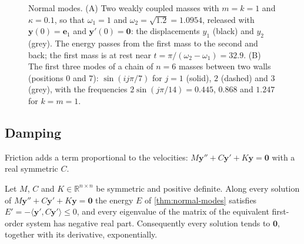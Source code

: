 \begin{figure}
\hfill
{}
\caption{Normal modes. (A) Two weakly coupled masses with $m=k=1$ and $\kappa=0.1$, so that $\omega_1=1$ and $\omega_2=\sqrt{1.2}=1.0954$, released with $\mathbf y(0)=\mathbf e_1$ and $\mathbf y'(0)=\mathbf 0$: the displacements $y_1$ (black) and $y_2$ (grey). The energy passes from the first mass to the second and back; the first mass is at rest near $t=\pi/(\omega_2-\omega_1)=32.9$. (B) The first three modes of a chain of $n=6$ masses between two walls (positions $0$ and $7$): $\sin(ij\pi/7)$ for $j=1$ (solid), $2$ (dashed) and $3$ (grey), with the frequencies $2\sin(j\pi/14)=0.445$, $0.868$ and $1.247$ for $k=m=1$.\label{fig:modes}}
\end{figure}

\subsection{Damping}

Friction adds a term proportional to the velocities: $M\mathbf y''+C\mathbf y'+K\mathbf y=\mathbf 0$ with a real symmetric  $C$.

\begin{proposition}
\label{prop:damped-vibrations}
Let $M$, $C$ and $K\in\mathbb R^{n\times n}$ be symmetric and positive definite. Along every solution of $M\mathbf y''+C\mathbf y'+K\mathbf y=\mathbf 0$ the energy $E$ of \cref{thm:normal-modes} satisfies $E'=-\langle\mathbf y',C\mathbf y'\rangle\le0$, and every eigenvalue of the matrix of the equivalent first-order system has negative real part. Consequently every solution tends to $\mathbf 0$, together with its derivative, exponentially.
\end{proposition}

